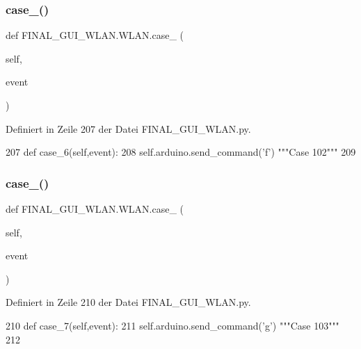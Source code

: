 \subsubsection{\texorpdfstring{case\+\_()}{case\_6()}}
{\footnotesize\ttfamily def F\+I\+N\+A\+L\+\_\+\+G\+U\+I\+\_\+\+W\+L\+A\+N.\+W\+L\+A\+N.\+case\+\_ (\begin{DoxyParamCaption}\item[{}]{self,  }\item[{}]{event }\end{DoxyParamCaption})}



Definiert in Zeile 207 der Datei F\+I\+N\+A\+L\+\_\+\+G\+U\+I\+\_\+\+W\+L\+A\+N.\+py.


\begin{DoxyCode}
207     \textcolor{keyword}{def }case\_6(self,event):
208         self.arduino.send\_command(\textcolor{stringliteral}{'f'})  \textcolor{stringliteral}{"""Case 102"""}
209     
\end{DoxyCode}
\mbox{\label{class_f_i_n_a_l___g_u_i___w_l_a_n_1_1_w_l_a_n_a49ef4e8a9cf99463eef06e7607511c2f}} 
\subsubsection{\texorpdfstring{case\+\_()}{case\_7()}}
{\footnotesize\ttfamily def F\+I\+N\+A\+L\+\_\+\+G\+U\+I\+\_\+\+W\+L\+A\+N.\+W\+L\+A\+N.\+case\+\_ (\begin{DoxyParamCaption}\item[{}]{self,  }\item[{}]{event }\end{DoxyParamCaption})}



Definiert in Zeile 210 der Datei F\+I\+N\+A\+L\+\_\+\+G\+U\+I\+\_\+\+W\+L\+A\+N.\+py.


\begin{DoxyCode}
210     \textcolor{keyword}{def }case\_7(self,event):
211         self.arduino.send\_command(\textcolor{stringliteral}{'g'})  \textcolor{stringliteral}{"""Case 103"""}
212         
\end{DoxyCode}
\mbox{\label{class_f_i_n_a_l___g_u_i___w_l_a_n_1_1_w_l_a_n_a3eddec1de07193250a7593ae4dd4b143}} 

